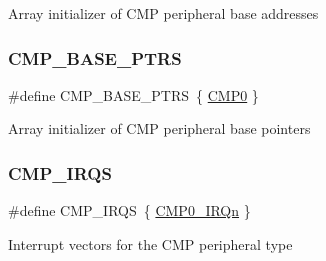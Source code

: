 Array initializer of C\+MP peripheral base addresses \mbox{\label{group___c_m_p___peripheral___access___layer_gacc69654296499d45b2060956a3c8e97f}} 
\subsubsection{\texorpdfstring{CMP\_BASE\_PTRS}{CMP\_BASE\_PTRS}}
{\footnotesize\ttfamily \#define C\+M\+P\+\_\+\+B\+A\+S\+E\+\_\+\+P\+T\+RS~\{ \mbox{\hyperlink{group___c_m_p___peripheral___access___layer_ga2cf98276319113bb5d9ece4d7d7ed09d}{C\+M\+P0}} \}}

Array initializer of C\+MP peripheral base pointers \mbox{\label{group___c_m_p___peripheral___access___layer_ga2497116c7859b3f4e8fe3e1b21a84cd9}} 
\subsubsection{\texorpdfstring{CMP\_IRQS}{CMP\_IRQS}}
{\footnotesize\ttfamily \#define C\+M\+P\+\_\+\+I\+R\+QS~\{ \mbox{\hyperlink{group___interrupt__vector__numbers_gga666eb0caeb12ec0e281415592ae89083a869842c366512b0bc4c29e77e8b32217}{C\+M\+P0\+\_\+\+I\+R\+Qn}} \}}

Interrupt vectors for the C\+MP peripheral type 